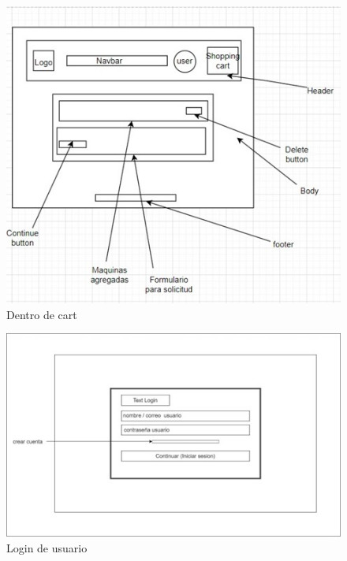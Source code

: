 \documentclass{article}
\begin{document}
\begin{figure}
    \centering
    \includegraphics[width=1.1\linewidth]{2.jpg}
    \caption{Dentro de cart}
    \label{fig:enter-label}
\end{figure}
\begin{figure}
    \centering
    \includegraphics[width=1.1\linewidth]{3.jpg}
    \caption{Login de usuario}
    \label{fig:enter-label}
\end{figure}
\end{document}
